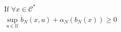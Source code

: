 \documentclass[preview]{standalone}
\begin{document}
\begin{align*}
&\text{If }\forall x \in \mathcal{C}^*\\ &\sup_{u \in \mathcal{U}} \dot b_N(x, u) + \alpha_N(b_N(x)) \geq 0
\end{align*}
\end{document}

